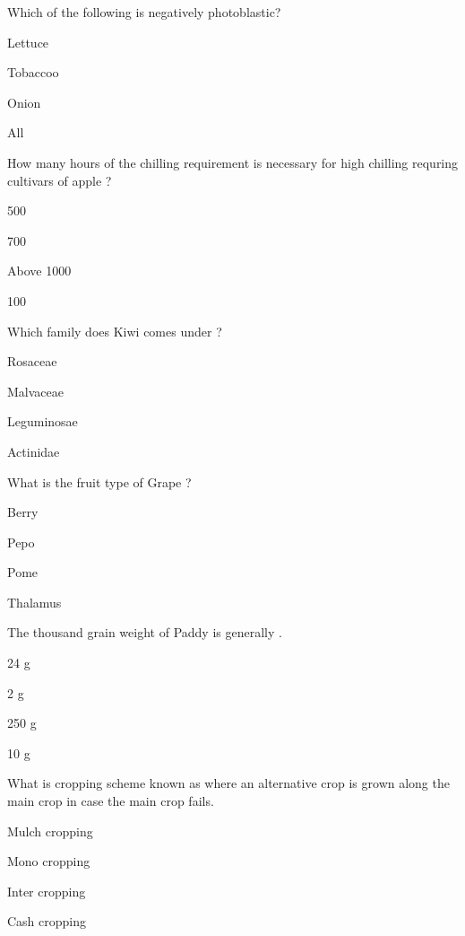 \begin{questions}
\question Which of the following is negatively photoblastic?
\begin{items}
\item Lettuce
\item Tobaccoo
\item* Onion
\item All
\end{items}

\question How many hours of the chilling requirement is necessary for high chilling requring cultivars of apple ?
\begin{items}
\item 500
\item 700
\item* Above 1000
\item 100
\end{items}

\question Which family does Kiwi comes under ?
\begin{items}
\item Rosaceae
\item Malvaceae
\item Leguminosae
\item* Actinidae
\end{items}

\question What is the fruit type of Grape ?
\begin{items}
\item* Berry
\item Pepo
\item Pome
\item Thalamus
\end{items}

\question The thousand grain weight of Paddy is generally \fillin[][3cm].
\begin{items}
\item* 24 g
\item 2 g
\item 250 g
\item 10 g
\end{items}

\question What is cropping scheme known as where an alternative crop is grown along the main crop in case the main crop fails.
\begin{items}
\item Mulch cropping
\item Mono cropping
\item* Inter cropping
\item Cash cropping
\end{items}


\end{questions}
